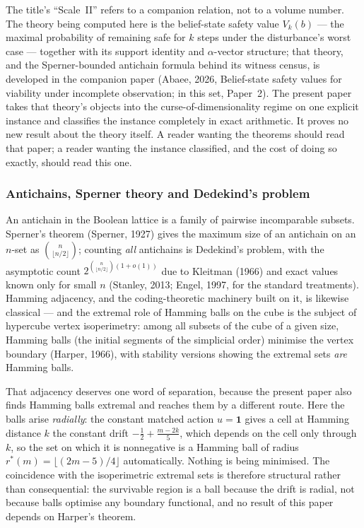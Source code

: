 \documentclass[10pt,twocolumn]{article}
\theoremstyle{plain}
\theoremstyle{definition}
\theoremstyle{remark}
\begin{document}
The title's ``Scale~II'' refers to a companion relation, not to a volume number. The
theory being computed here is the belief-state safety value \(V_k(b)\) --- the maximal
probability of remaining safe for \(k\) steps under the disturbance's worst case --- together
with its support identity and \(\alpha\)-vector structure; that theory, and the
Sperner-bounded antichain formula behind its witness census, is developed in the companion
paper (Abaee, 2026, Belief-state safety values for viability under incomplete observation;
in this set, Paper~2). The present paper takes that theory's objects into the
curse-of-dimensionality regime on one explicit instance and classifies the instance
completely in exact arithmetic. It proves no new result about the theory itself. A reader
wanting the theorems should read that paper; a reader wanting the instance classified, and
the cost of doing so exactly, should read this one.

\subsubsection{Antichains, Sperner theory and Dedekind's problem}

An antichain in the Boolean lattice is a family of pairwise incomparable subsets. Sperner's
theorem (Sperner, 1927) gives the maximum size of an antichain on an \(n\)-set as
\(\binom{n}{\lfloor n/2\rfloor}\); counting \emph{all} antichains is Dedekind's problem,
with the asymptotic count \(2^{\binom{n}{\lfloor n/2\rfloor}(1+o(1))}\) due to Kleitman
(1966) and exact values known only for small \(n\) (Stanley, 2013; Engel, 1997, for the
standard treatments). Hamming adjacency, and the coding-theoretic machinery built on it, is
likewise classical --- and the extremal role of Hamming balls on the cube is the subject of
hypercube vertex isoperimetry: among all subsets of the cube of a given size, Hamming balls
(the initial segments of the simplicial order) minimise the vertex boundary (Harper, 1966),
with stability versions showing the extremal sets \emph{are} Hamming balls.

That adjacency deserves one word of separation, because the present paper also finds Hamming
balls extremal and reaches them by a different route. Here the balls arise \emph{radially}: the
constant matched action \(u = \mathbf{1}\) gives a cell at Hamming distance \(k\) the constant
drift \(-\tfrac12 + \tfrac{m-2k}{5}\), which depends on the cell only through \(k\), so the set
on which it is nonnegative is a Hamming ball of radius \(r^{*}(m) = \lfloor (2m-5)/4\rfloor\)
automatically. Nothing is being minimised. The coincidence with the isoperimetric extremal sets
is therefore structural rather than consequential: the survivable region is a ball because the
drift is radial, not because balls optimise any boundary functional, and no result of this
paper depends on Harper's theorem.
\end{document}
